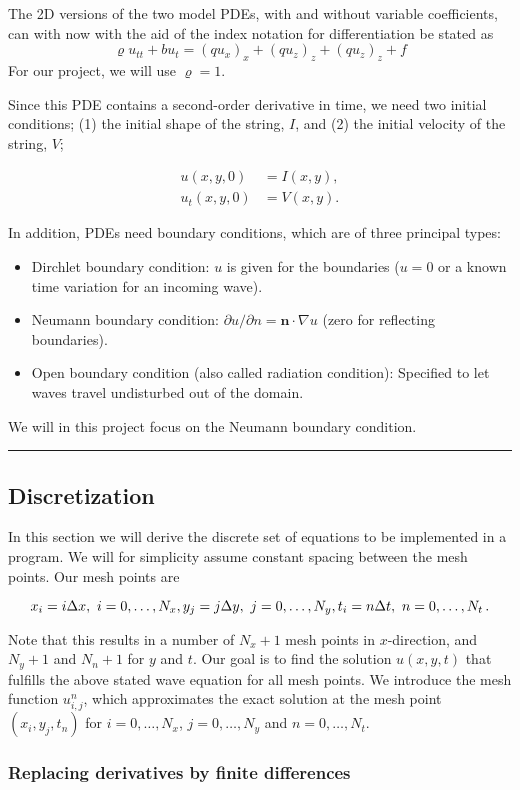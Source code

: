 \documentclass[letterpaper,10pt,english]{/usr/share/sphinx/texinputs/sphinxhowto}
\begin{document}
The 2D versions of the two model PDEs, with and without variable
coefficients, can with now with the aid of the index notation for
differentiation be stated as \[
\varrho u_{tt} + b u_{t}= (q u_x)_x + (q u_z)_z + (q u_z)_z + f
\] For our project, we will use $\varrho = 1$.

Since this PDE contains a second-order derivative in time, we need two
initial conditions; (1) the initial shape of the string, $I$, and (2)
the initial velocity of the string, $V$;

\begin{align*}
u(x,y,0)&=I(x,y),\\
u_t(x,y,0)&=V(x,y).
\end{align*}

In addition, PDEs need boundary conditions, which are of three principal
types:

\begin{itemize}
\itemsep1pt\parskip0pt
\item
  Dirchlet boundary condition: $u$ is given for the boundaries ($u=0$ or
  a known time variation for an incoming wave).
\item
  Neumann boundary condition:
  $\partial u/\partial n = \boldsymbol{n}\cdot\nabla u$ (zero for
  reflecting boundaries).
\item
  Open boundary condition (also called radiation condition): Specified
  to let waves travel undisturbed out of the domain.
\end{itemize}

We will in this project focus on the Neumann boundary condition.\begin{center}\rule{3in}{0.4pt}\end{center}

\subsection{Discretization}

In this section we will derive the discrete set of equations to be
implemented in a program. We will for simplicity assume constant spacing
between the mesh points. Our mesh points are

\[
x_i = i\Delta x,\ i=0,\ldots,N_x,\quad \\ 
y_j = j\Delta y,\ j=0,\ldots,N_y,\quad \\
t_i = n\Delta t,\ n=0,\ldots,N_t{\thinspace .}
\]

Note that this results in a number of $N_x + 1$ mesh points in
$x$-direction, and $N_y + 1$ and $N_n + 1$ for $y$ and $t$. Our goal is
to find the solution $u(x,y,t)$ that fulfills the above stated wave
equation for all mesh points. We introduce the mesh function
$u_{i,j}^n$, which approximates the exact solution at the mesh point
$(x_i,y_j,t_n)$ for $i=0,\ldots,N_x$, $j=0,\ldots,N_y$ and
$n=0,\ldots,N_t$.\subsubsection{Replacing derivatives by finite differences}
\end{document}
